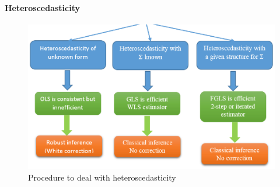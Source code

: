 \paragraph{Heteroscedasticity}
\begin{figure}[H]
	\begin{center}
		\includegraphics[width=\textwidth]{./chap/1chap/2sec/3images/6_heteroscedasticity.PNG}
	\end{center}
	\caption{Procedure to deal with heteroscedasticity}
	\label{fig:6_heteroscedasticity}
\end{figure}
